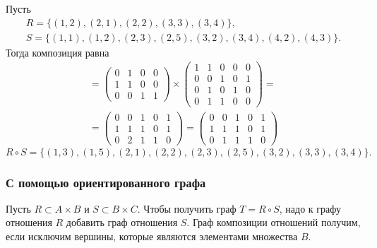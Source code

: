 \begin{example*}
    Пусть
    \begin{gather*}
        R = \{(1, 2), (2, 1), (2, 2), (3, 3), (3, 4)\},
        \\
        S = \{(1, 1), (1, 2), (2, 3), (2, 5), (3, 2), (3, 4), (4, 2), (4, 3)\}.
    \end{gather*}
    Тогда композиция равна
    \begin{gather*}
        [R \circ S] =
        \begin{pmatrix}
            0 & 1 & 0 & 0 \\
            1 & 1 & 0 & 0 \\
            0 & 0 & 1 & 1
        \end{pmatrix}
        \times
        \begin{pmatrix}
            1 & 1 & 0 & 0 & 0 \\
            0 & 0 & 1 & 0 & 1 \\
            0 & 1 & 0 & 1 & 0 \\
            0 & 1 & 1 & 0 & 0
        \end{pmatrix}
        = \\ =
        \begin{pmatrix}
            0 & 0 & 1 & 0 & 1 \\
            1 & 1 & 1 & 0 & 1 \\
            0 & 2 & 1 & 1 & 0
        \end{pmatrix}
        =
        \begin{pmatrix}
            0 & 0 & 1 & 0 & 1 \\
            1 & 1 & 1 & 0 & 1 \\
            0 & 1 & 1 & 1 & 0
        \end{pmatrix}
    \end{gather*}
    \[
        R \circ S = \{(1, 3), (1, 5), (2, 1), (2, 2), (2, 3), (2, 5), (3, 2), (3, 3), (3, 4)\}.
    \]
\end{example*}

\subsubsection{С помощью ориентированного графа}

Пусть \(R \subset A \times B\) и \(S \subset B \times C\). Чтобы получить граф \(T = R \circ S\), надо к графу отношения \(R\) добавить граф отношения \(S\). Граф композиции отношений получим, если исключим вершины, которые являются элементами множества \(B\).

